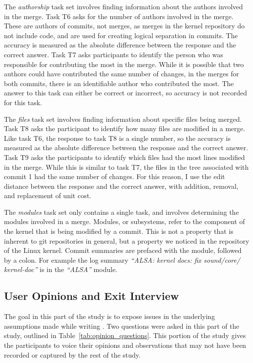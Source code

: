 The \emph{authorship} task set involves finding information about the
authors involved in the merge. Task T6 asks for the number of authors
involved in the merge. These are authors of commits, not merges, as
merges in the kernel repository do not include code, and are used for
creating logical separation in commits. The accuracy is measured as the
absolute difference between the response and the correct answer. Task T7
asks participants to identify the person who was responsible for
contributing the most in the merge. While it is possible that two
authors could have contributed the same number of changes, in the merges
for both commits, there is an identifiable author who contributed the
most. The answer to this task can either be correct or incorrect, so
accuracy is not recorded for this task.

The \emph{files} task set involves finding information about specific
files being merged. Task T8 asks the participant to identify how many
files are modified in a merge. Like task T6, the response to task T8 is
a single number, so the accuracy is measured as the absolute difference
between the response and the correct answer. Task T9 asks the
participants to identify which files had the most lines modified in
the merge. While this is similar to task T7, the files in the tree
associated with commit 1 had the same number of changes. For this
reason, I use the edit distance between the response and the correct
answer, with addition, removal, and replacement of unit cost.

The \emph{modules} task set only contains a single task, and involves
determining the modules involved in a merge. Modules, or subsystems,
refer to the component of the kernel that is being modified by a commit.
This is not a property that is inherent to git repositories in general,
but a property we noticed in the repository of the Linux kernel. Commit
summaries are prefaced with the module, followed by a colon. For example
the log summary \textit{``ALSA: kernel docs: fix sound/core/
  kernel-doc''} is in the \textit{``ALSA''} module.

\subsection{User Opinions and Exit Interview}
\label{sub:user_opinions_and_exit_interview}

The goal in this part of the study is to expose issues in the underlying
assumptions made while writing \tool{}. Two questions were asked in this
part of the study, outlined in Table~\ref{tab:opinion_questions}. This
portion of the study gives the participants to voice their opinions and
observations that may not have been recorded or captured by the rest of
the study.

